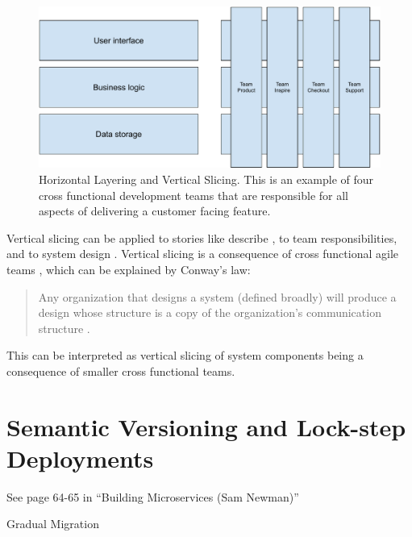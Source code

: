 \begin{figure}
    \centering
    \includegraphics[width=\linewidth]{images/vertical-slicing.pdf}
    \caption{Horizontal Layering and Vertical Slicing. This is an example of four cross functional development teams that are responsible for all aspects of delivering a customer facing feature.}
    \label{fig:vertical-slicing}
\end{figure}

Vertical slicing can be applied to stories like \citeauthor{Ratner2011} describe \cite{Ratner2011}, to team responsibilities, and to system design \cite{Geers2020}. Vertical slicing is a consequence of cross functional agile teams \cite{Geers2020}, which can be explained by Conway's law: \blockquote{Any organization that designs a system (defined broadly) will produce a design whose structure is a copy of the organization's communication structure \cite{Conway}.} This can be interpreted as vertical slicing of system components being a consequence of smaller cross functional teams.

\section{Semantic Versioning and Lock-step Deployments}

See page 64-65 in ``Building Microservices (Sam Newman)''

Gradual Migration
